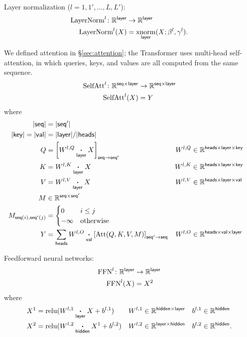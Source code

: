 \documentclass{article}
\newcommand{\reals}{\mathbb{R}}
\begin{document}
Layer normalization ($l = 1, 1', \ldots, L, L'$):
\begin{align*}
  \text{LayerNorm}^l \colon \mathbb{R}^{\name{layer}} &\rightarrow \mathbb{R}^{\name{layer}} \\
  \text{LayerNorm}^l(X) &= \nfun{layer}{xnorm}(X; \beta^l, \gamma^l).
\end{align*}

We defined attention in \S\ref{sec:attention}; the Transformer uses multi-head self-attention, in which queries, keys, and values are all computed from the same sequence.
\begin{align*}
  \text{SelfAtt}^l \colon \mathbb{R}^{\name{seq} \times \name{layer}} &\rightarrow \mathbb{R}^{\name{seq} \times \name{layer}} \\
  \text{SelfAtt}^l(X) &= Y
\end{align*}
where
\begin{align*}
  |\name{seq}| &= |\name{seq'}| \\
  |\name{key}| = |\name{val}| &= |\name{layer}|/|\name{heads}| \\
  Q &= \nmov{seq}{seq'}{W^{l,Q} \ndot{layer} X} & W^{l,Q} &\in \mathbb{R}^{\name{heads} \times \name{layer} \times \name{key}} \\
  K &= W^{l,K} \ndot{layer} X & W^{l,K} &\in \mathbb{R}^{\name{heads} \times \name{layer} \times \name{key}} \\
  V &= W^{l,V} \ndot{layer} X & W^{l,V} &\in \mathbb{R}^{\name{heads} \times \name{layer} \times \name{val}} \\
  M & \in \reals^{\name{seq} \times \name{seq'}} \\
  M_{\nidx{seq}{i}, \nidx{seq'}{j}} &= \begin{cases}
    0 & i \leq j\\
    -\infty & \text{otherwise}
  \end{cases} \\
  Y &= \nsum{heads} W^{l,O} \ndot{val} \nmov{seq'}{seq}{\text{Att}(Q, K, V, M)} & W^{l,O} &\in \mathbb{R}^{\name{heads} \times \name{val} \times \name{layer}}
\end{align*}

Feedforward neural networks:
\begin{align*}
  \text{FFN}^l \colon \mathbb{R}^{\name{layer}} &\rightarrow \mathbb{R}^{\name{layer}} \\
  \text{FFN}^l(X) &= X^2
\end{align*}
where
\begin{align*}
  X^1 &= \text{relu}(W^{l,1} \ndot{layer} X + b^{l,1}) & W^{l,1} &\in \mathbb{R}^{\name{hidden} \times \name{layer}} & b^{l,1} &\in \mathbb{R}^{\name{hidden}} \\
  X^2 &= \text{relu}(W^{l,2} \ndot{hidden} X^1 + b^{l,2}) & W^{l,2} &\in \mathbb{R}^{\name{layer} \times \name{hidden}} & b^{l,2} &\in \mathbb{R}^{\name{hidden}}.
\end{align*}
\end{document}
